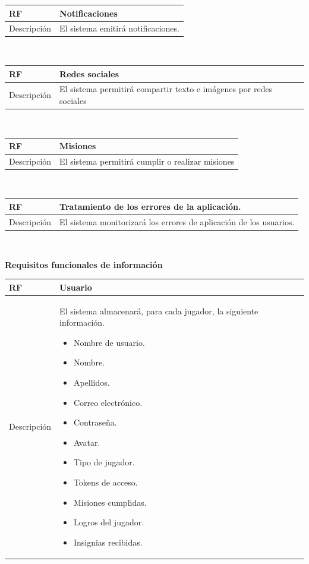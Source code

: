 \documentclass[twoside]{report}
\newcommand\addrow[2]{#1 &#2\\ }
\newcommand\addheading[2]{#1 &#2\\ \hline}
\newcommand\tabularhead{\begin{tabular}{lp{0.7\textwidth}}
\hline
}
\newenvironment{req}{\tabularhead}
{\hline\end{tabular}}
\begin{document}
\begin{req}
	\addheading{\textbf{RF\arabic{functionalRequirements}}}{Notificaciones}
	\addrow{Descripción}{El sistema emitirá notificaciones.}
\end{req}\\

\begin{req}
	\addheading{\textbf{RF\arabic{functionalRequirements}}}{Redes sociales}
	\addrow{Descripción}{El sistema permitirá compartir texto e imágenes por redes sociales}
\end{req}\\

\begin{req}
	\addheading{\textbf{RF\arabic{functionalRequirements}}}{Misiones}
	\addrow{Descripción}{El sistema permitirá cumplir o realizar misiones}
\end{req}\\

\begin{req}
	\addheading{\textbf{RF\arabic{functionalRequirements}}}{Tratamiento de los errores de la aplicación.}
	\addrow{Descripción}{El sistema monitorizará los errores de aplicación de los usuarios.}
\end{req}\\

\textbf{Requisitos funcionales de información}\\

\begin{req}
	\addheading{\textbf{RF\arabic{functionalRequirements}}}{Usuario}
	\addrow{Descripción}{
	El sistema almacenará, para cada jugador, la siguiente información.
	\begin{multicols}{2}
	\begin{itemize}
		\item Nombre de usuario.
		\item Nombre.
		\item Apellidos.
		\item Correo electrónico.
		\item Contraseña.
		\item Avatar.
		\item Tipo de jugador.
		\item Tokens de acceso.
		\item Misiones cumplidas.
		\item Logros del jugador.
		\item Insignias recibidas.
	\end{itemize}
	\end{multicols}
	}
\end{req}\\
\end{document}
